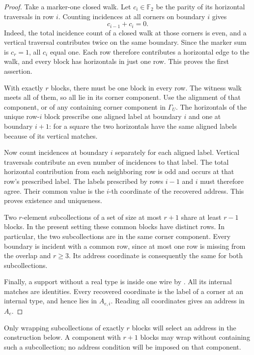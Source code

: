 \documentclass[11pt]{article}
\theoremstyle{definition}
\begin{document}
\begin{proof}
Take a marker-one closed walk. Let \(c_i\in\mathbb F_2\) be the parity of its
horizontal traversals in row \(i\). Counting incidences at all corners
on boundary \(i\) gives
\[
 c_{i-1}+c_i=0.
\]
Indeed, the total incidence count of a closed walk at those corners is
even, and a vertical traversal contributes twice on the same boundary.
Since the marker sum is \(c_r=1\), all \(c_i\) equal one. Each row
therefore contributes a horizontal edge to the walk, and every block
has horizontals in just one row. This proves the first assertion.

With exactly \(r\) blocks, there must be one block in every row.
The witness walk meets all of them, so all lie in its corner component.
Use the alignment of that component, or of any containing corner
component in \(\Gamma_U\). The horizontals of the unique row-\(i\)
block prescribe one aligned label at boundary \(i\) and one at boundary
\(i+1\): for a square the two horizontals have the same aligned labels
because of its vertical matches.

Now count incidences at boundary \(i\) separately for each aligned label.
Vertical traversals contribute an even number of incidences to that
label. The total horizontal contribution from each neighboring row is
odd and occurs at that row's prescribed label. The labels prescribed
by rows \(i-1\) and \(i\) must therefore agree. Their common value is the
\(i\)-th coordinate of the recovered address. This proves existence and
uniqueness.

Two \(r\)-element subcollections of a set of size at most \(r+1\) share
at least \(r-1\) blocks. In the present setting these common blocks have
distinct rows. In particular, the two subcollections are in the same
corner component. Every boundary is incident with a common row, since
at most one row is missing from the overlap and \(r\ge3\). Its address
coordinate is consequently the same for both subcollections.

Finally, a support without a real type is inside one wire by
. All its internal matches are identities.
Every recovered coordinate is the label of a corner at an internal
type, and hence lies in \(A_{e,i}\). Reading all coordinates gives an
address in \(A_e\).
\end{proof}

Only wrapping subcollections of exactly \(r\) blocks will select an
address in the construction below. A component with \(r+1\) blocks may
wrap without containing such a subcollection; no address condition will
be imposed on that component.
\end{document}
